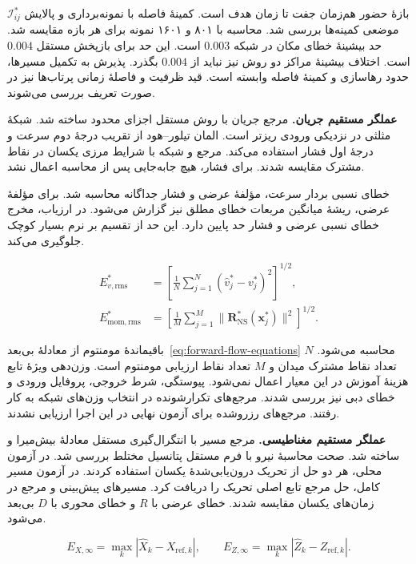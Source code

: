 $\mathcal I_{ij}^*$ بازهٔ حضور هم‌زمان جفت تا زمان هدف است.
کمینهٔ فاصله با نمونه‌برداری و پالایش موضعی کمینه‌ها بررسی شد.
محاسبه با ۸۰۱ و ۱۶۰۱ نمونه برای هر بازه مقایسه شد.
حد بیشینهٔ خطای مکان در شبکه $0.003$ است.
این حد برای بازپخش مستقل $0.004$ است.
اختلاف بیشینهٔ مراکز دو روش نیز نباید از $0.004$ بگذرد.
پذیرش به تکمیل مسیرها، حدود رهاسازی و کمینهٔ فاصله وابسته است.
قید ظرفیت و فاصلهٔ زمانی پرتاب‌ها نیز در صورت تعریف بررسی می‌شوند.

\textbf{عملگر مستقیم جریان.}
مرجع جریان با روش مستقل اجزای محدود ساخته شد.
شبکهٔ مثلثی در نزدیکی ورودی ریزتر است.
المان تیلور–هود از تقریب درجهٔ دوم سرعت و درجهٔ اول فشار استفاده می‌کند.
مرجع و شبکه با شرایط مرزی یکسان در نقاط مشترک مقایسه شدند.
برای فشار، هیچ جابه‌جایی پس از محاسبه اعمال نشد.

خطای نسبی بردار سرعت، مؤلفهٔ عرضی و فشار جداگانه محاسبه شد.
برای مؤلفهٔ عرضی، ریشهٔ میانگین مربعات خطای مطلق نیز گزارش می‌شود.
در ارزیاب، مخرج خطای نسبی عرضی و فشار حد پایین دارد.
این حد از تقسیم بر نرم بسیار کوچک جلوگیری می‌کند.

\begin{equation}
\begin{aligned}
E_{v,\mathrm{rms}}^*
&=\left[\frac1N\sum_{j=1}^N(\widehat v_j^*-v_j^*)^2\right]^{1/2},\\
E_{\mathrm{mom,rms}}^*
&=\left[\frac1M\sum_{j=1}^M
 \|\mathbf R_{\mathrm{NS}}^*(\mathbf x_j^*)\|^2\right]^{1/2}.
\end{aligned}
\label{eq:validation-forward-flow-rms}
\end{equation}

باقیماندهٔ مومنتوم از معادلهٔ بی‌بعد~\eqref{eq:forward-flow-equations} محاسبه می‌شود.
$N$ تعداد نقاط مشترک میدان و $M$ تعداد نقاط ارزیابی مومنتوم است.
وزن‌دهی ویژهٔ تابع هزینهٔ آموزش در این معیار اعمال نمی‌شود.
پیوستگی، شرط خروجی، پروفایل ورودی و خطای دبی نیز بررسی شدند.
مرجع‌های تکرارشونده در انتخاب وزن‌های شبکه به کار رفتند.
مرجع‌های رزروشده برای آزمون نهایی در این اجرا ارزیابی نشدند.

\textbf{عملگر مستقیم مغناطیسی.}
مرجع مسیر با انتگرال‌گیری مستقل معادلهٔ بیش‌میرا و  ساخته شد.
صحت محاسبهٔ نیرو با فرم مستقل پتانسیل مختلط بررسی شد.
در آزمون محلی، هر دو حل از تحریک درون‌یابی‌شدهٔ یکسان استفاده کردند.
در آزمون مسیر کامل، حل مرجع تابع اصلی تحریک را دریافت کرد.
مسیرهای پیش‌بینی و مرجع در زمان‌های یکسان مقایسه شدند.
خطای عرضی با $R$ و خطای محوری با $D$ بی‌بعد می‌شود.

\begin{equation}
E_{X,\infty}=\max_k|\widehat X_k-X_{\mathrm{ref},k}|,
\qquad
E_{Z,\infty}=\max_k|\widehat Z_k-Z_{\mathrm{ref},k}|.
\label{eq:validation-forward-magnetic-errors}
\end{equation}

